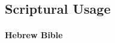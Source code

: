 
\subsection{Scriptural Usage} %
	\label{CREATION-SCRIPTURES}

	
	
			
			
		\paragraph{Hebrew Bible}
			\label{*CREATION-HEBREW}
		
			\subparagraph{\texorpdfstring{}{}} %
				\label{BARA} %
			
